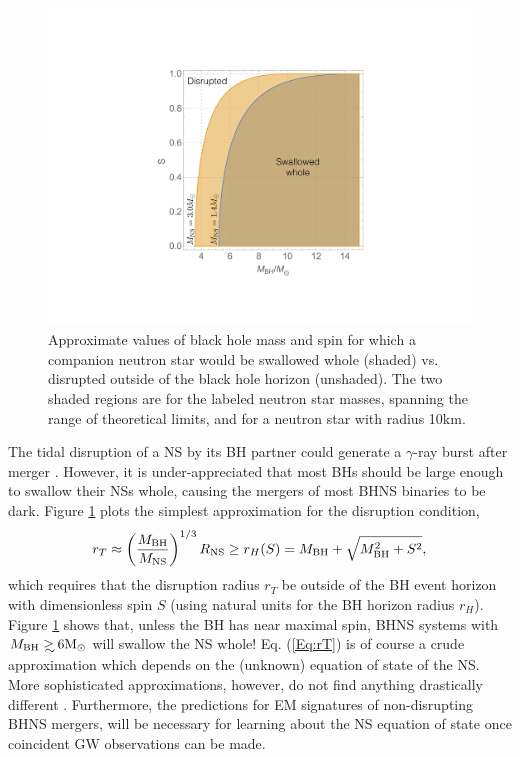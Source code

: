 \begin{figure}
\begin{center}
\includegraphics[scale=0.33]{figures/ch0/BHNS_TDs} 
\end{center}
\caption{Approximate values of black hole mass and spin for which a companion neutron star would be swallowed whole (shaded) vs. disrupted outside of the black hole horizon (unshaded). The two shaded regions are for the labeled neutron star masses, spanning the range of theoretical limits, and for a neutron star with radius 10km.}
\label{Fig:NSBH_TDs}
\end{figure}

The tidal disruption of a NS by its BH partner could generate a $\gamma$-ray
burst after merger \citep{NPP:NSBH_GRB:1992}. However, it is under-appreciated
that most BHs should be large enough to swallow their NSs
whole, causing the mergers of most BHNS binaries to be dark. Figure 
\ref{Fig:NSBH_TDs} plots the simplest approximation for the disruption condition,
\begin{equation}
 r_T \approx \left( \frac{M_{\rm{BH}} }{ M_{\rm{NS}}} \right)^{1/3} R_{\rm{NS}} \geq r_H(S) 
 = M_{\rm{BH}} + \sqrt{M^2_{\rm{BH}} + S^2},
 \label{Eq:rT}
\end{equation}
which requires that the disruption radius $r_T$ be outside of the BH event horizon
with dimensionless spin $S$ (using natural units for the BH horizon
radius $r_H$). Figure \ref{Fig:NSBH_TDs} shows that, unless the BH has near maximal
spin, BHNS systems with $M_{\rm{BH}} \gsim 6 \msun$ will swallow the NS whole!
Eq. (\ref{Eq:rT}) is of course a crude approximation which depends on the
(unknown) equation of state of the NS. More sophisticated approximations,
however, do not find anything drastically different
\citep[\textit{e.g.}][]{Foucart:2012}. Furthermore, the predictions for EM
signatures of non-disrupting BHNS mergers, will be necessary for learning
about the NS equation of state once coincident GW observations can be made.


